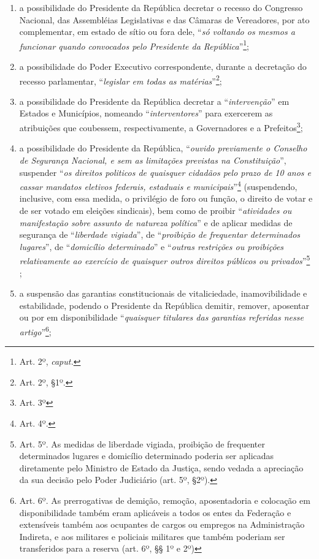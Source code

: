 \begin{enumerate}
\item{}a possibilidade do Presidente da República decretar o recesso do
Congresso Nacional, das Assembléias Legislativas e das Câmaras de
Vereadores, por ato complementar, em estado de sítio ou fora dele,
``\emph{só voltando os mesmos a funcionar quando convocados pelo
Presidente da República}''\footnote{Art. 2º, \emph{caput.}};

\item{}a possibilidade do Poder Executivo correspondente, durante a
decretação do recesso parlamentar, ``\emph{legislar em todas as
matérias}''\footnote{Art. 2º, §1º.};

\item{}a possibilidade do Presidente da República decretar a
``\emph{intervenção}'' em Estados e Municípios, nomeando
``\emph{interventores}'' para exercerem as atribuições que coubessem,
respectivamente, a Governadores e a Prefeitos\footnote{Art. 3º};

\item{}a possibilidade do Presidente da República, ``\emph{ouvido
previamente o Conselho de Segurança Nacional, e sem as limitações
previstas na Constituição}'', suspender ``\emph{os direitos politicos de
quaisquer cidadãos pelo prazo de 10 anos e cassar mandatos eletivos
federais, estaduais e municipais}''\footnote{Art. 4º.} (suspendendo,
inclusive, com essa medida, o privilégio de foro ou função, o direito de
votar e de ser votado em eleições sindicais), bem como de proibir
``\emph{atividades ou manifestação sobre assunto de natureza política}''
e de aplicar medidas de segurança de ``\emph{liberdade vigiada}'', de
``\emph{proibição de frequentar determinados lugares}'', de
``\emph{domicílio determinado}'' e ``\emph{outras restrições ou
proibições relativamente ao exercício de quaisquer outros direitos
públicos ou privados}''\footnote{Art. 5º. As medidas de liberdade
  vigiada, proibição de frequenter determinados lugares e domicílio
  determinado poderia ser aplicadas diretamente pelo Ministro de Estado
  da Justiça, sendo vedada a apreciação da sua decisão pelo Poder
  Judiciário (art. 5º, §2º).} ;

\item{}a suspensão das garantias constitucionais de vitaliciedade,
inamovibilidade e estabilidade, podendo o Presidente da República
demitir, remover, aposentar ou por em disponibilidade ``\emph{quaisquer
titulares das garantias referidas nesse artigo}''\footnote{Art. 6º. As
  prerrogativas de demição, remoção, aposentadoria e colocação em
  disponibilidade também eram aplicáveis a todos os entes da Federação e
  extensíveis também aos ocupantes de cargos ou empregos na
  Administração Indireta, e aos militares e policiais militares que
  também poderiam ser transferidos para a reserva (art. 6º, §§ 1º e 2º)};


\end{enumerate}
